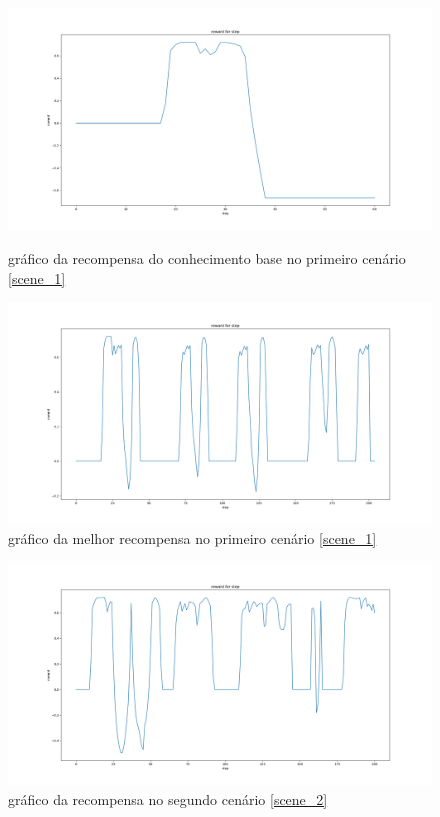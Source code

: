 \documentclass[
	12pt,				%
	openright,			%
	oneside,			%
	a4paper,			%
	brazil,				%
	]{abntex2}
\begin{document}
\begin{figure}
\includegraphics[width = 1\textwidth]{Imagens/badreward_step.png}
	 \caption{gráfico da recompensa do conhecimento base no primeiro cenário \ref{scene_1}}
	 \label{badRewardStep1}

\includegraphics[width = 1\textwidth]{Imagens/reward_step.png}
	 \caption{gráfico da melhor recompensa no primeiro cenário \ref{scene_1}}
	 \label{rewardStep1}

\end{figure}

\begin{figure}
 \includegraphics[width = 1\textwidth]{Imagens/reward_step2.png}
	  \caption{gráfico da recompensa no segundo cenário \ref{scene_2}}
	 \label{rewardStep2}
\end{figure}
\end{document}
